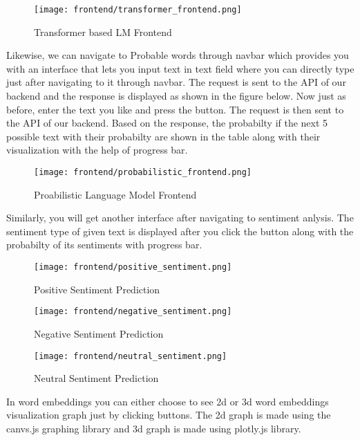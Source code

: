\begin{figure}[H]
    \centering
    \texttt{[image: frontend/transformer\_frontend.png]}
    \caption{Transformer based LM Frontend}
    \label{fig: Transformer based LM Frontend}
\end{figure}

Likewise, we can navigate to Probable words through navbar which provides you with an interface that lets you input text in text field where you can directly type just after navigating to it through navbar.  The request is sent to the API of our backend and the response is displayed as shown in the figure below. Now just as before, enter the text you like and  press the button. The request is then sent to the API of our backend. Based on the response, the probabilty if the next 5 possible text with their probabilty are shown in the table along with their visualization with the help of progress bar.

\begin{figure}[H]
    \centering
    \texttt{[image: frontend/probabilistic\_frontend.png]}
    \caption{Proabilistic Language Model Frontend}
    \label{fig: Proabilistic LM Frontend}
\end{figure}

Similarly, you will get another interface after navigating to sentiment anlysis. The sentiment type of given text is displayed after you click the button along with the probabilty of its sentiments with progress bar.

\begin{figure}[H]
    \centering
    \texttt{[image: frontend/positive\_sentiment.png]}
    \caption{Positive Sentiment Prediction}
    \label{fig: Positive Sentiment Prediction}
\end{figure}

\begin{figure}[H]
    \centering
    \texttt{[image: frontend/negative\_sentiment.png]}
    \caption{Negative Sentiment Prediction}
    \label{fig: Negative Sentiment Prediction}
\end{figure}

\begin{figure}[H]
    \centering
    \texttt{[image: frontend/neutral\_sentiment.png]}
    \caption{Neutral Sentiment Prediction}
    \label{fig: Neutral Sentiment Prediction}
\end{figure}



In word embeddings you can either choose to see 2d or 3d word embeddings visualization graph just by clicking buttons. The 2d graph is made using the canvs.js graphing library and 3d graph is made using plotly.js library.

